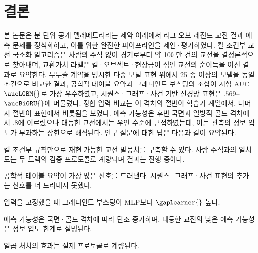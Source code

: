 
\section{결론}

본 논문은 분 단위 공개 텔레메트리라는 제약 아래에서 리그 오브 레전드 교전 결과 예측 문제를 정식화하고, 이를 위한 완전한 파이프라인을 제안·평가하였다. 킬 조건부 교전 국소화 알고리즘은 사람의 주석 없이 \numMatches{} 경기로부터 약 100 만 건의 교전을 결정론적으로 찾아내며, 교환가치 라벨은 킬·오브젝트·현상금이 섞인 교전의 순이득을 이진 결과로 요약한다. 무누출 계약을 명시한 다중 모달 표현 위에서 25 종 이상의 모델을 동일 조건으로 비교한 결과, 공학적 테이블 요약과 그래디언트 부스팅의 조합이 시험 AUC $\aucLGBM{}$로 가장 우수하였고, 시퀀스·그래프·사건 기반 신경망 표현은 $.569$--$\aucBiGRU{}$에 머물렀다. 정합 입력 비교는 이 격차의 절반이 학습기 계열에서, 나머지 절반이 표현에서 비롯됨을 보였다. 예측 가능성은 후반 국면과 일방적 골드 격차에서 $.8$에 이르렀으나 대등한 교전에서는 우연 수준에 근접하였는데, 이는 관측의 정보 입도가 부과하는 상한으로 해석된다. 연구 질문에 대한 답은 다음과 같이 요약된다.

\begin{description}[leftmargin=3.2em,style=nextline]
  \item[RQ1] 킬 조건부 규칙만으로 재현 가능한 교전 말뭉치를 구축할 수 있다. 사람 주석과의 일치도는 두 트랙의 검증 프로토콜로 계량되며 결과는 진행 중이다.
  \item[RQ2] 공학적 테이블 요약이 가장 많은 신호를 드러낸다. 시퀀스·그래프·사건 표현의 추가는 신호를 더 드러내지 못했다.
  \item[RQ3] 입력을 고정했을 때 그래디언트 부스팅이 MLP보다 $\gapLearner{}$ 높다.
  \item[RQ4] 예측 가능성은 국면·골드 격차에 따라 단조 증가하며, 대등한 교전의 낮은 예측 가능성은 정보 입도 한계로 설명된다.
  \item[RQ5] 일곱 처치의 효과는 절제 프로토콜로 계량된다. 
\end{description}
